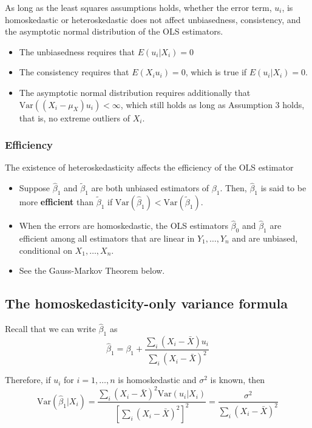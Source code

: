 \documentclass[a4paper,11pt]{article}
\newcommand{\var}{\mathrm{Var}}
\begin{document}
As long as the least squares assumptions holds, whether the error
term, \(u_i\), is homoskedastic or heteroskedastic does not affect
unbiasedness, consistency, and the asymptotic normal distribution
of the OLS estimators.
\begin{itemize}
\item The unbiasedness requires that \(E(u_i|X_i) = 0\)
\item The consistency requires that \(E(X_i u_i) = 0\), which is true if
\(E(u_i|X_i)=0\).
\item The asymptotic normal distribution requires additionally that
\(\var((X_i-\mu_X)u_i) < \infty\), which still holds as long as
Assumption 3 holds, that is, no extreme outliers of \(X_i\).
\end{itemize}

\subsubsection*{Efficiency}
\label{sec:org64667f9}

The existence of heteroskedasticity affects the efficiency of the
OLS estimator
\begin{itemize}
\item Suppose \(\hat{\beta}_1\) and \(\tilde{\beta}_1\) are both unbiased
estimators of \(\beta_1\). Then, \(\hat{\beta}_1\) is said to be more
\textbf{efficient} than \(\tilde{\beta}_1\) if \(\var(\hat{\beta}_1) <
  \var(\tilde{\beta}_1)\).
\item When the errors are homoskedastic, the OLS estimators
\(\hat{\beta}_0\) and \(\hat{\beta}_1\) are efficient among all
estimators that are linear in \(Y_1, \ldots, Y_n\) and are unbiased,
conditional on \(X_1, \ldots, X_n\).

\item See the Gauss-Markov Theorem below.
\end{itemize}


\subsection{The homoskedasticity-only variance formula}
\label{sec:org3e75f30}

Recall that we can write \(\hat{\beta}_1\) as
\begin{equation*}
\hat{\beta}_1 = \beta_1 + \frac{\sum_i (X_i - \bar{X})u_i}{\sum_i
(X_i - \bar{X})^2} 
\end{equation*} 

Therefore, if \(u_i\) for \(i=1, \ldots, n\) is
homoskedastic and \(\sigma^2\) is known, then
\begin{equation}
\label{eq:vbeta-1a} \var(\hat{\beta}_1 | X_i) = \frac{\sum_i (X_i -
\bar{X})^2 \var(u_i|X_i)}{\left[\sum_i (X_i - \bar{X})^2\right]^2} =
\frac{\sigma^2}{\sum_i (X_i - \bar{X})^2} 
\end{equation} 
\end{document}
